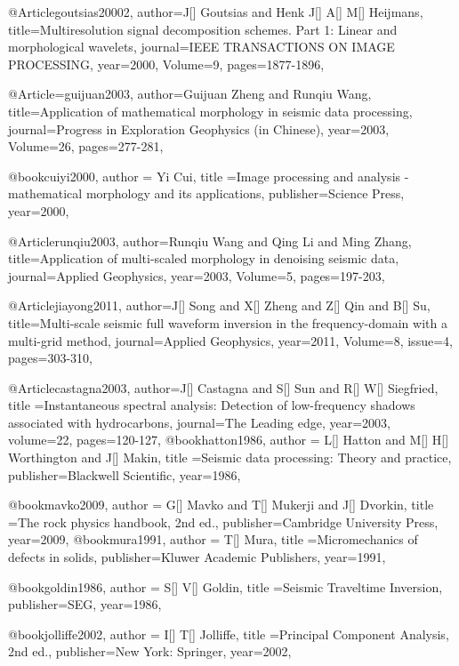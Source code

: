 @Article{goutsias20002,
  author={J[] Goutsias and Henk J[] A[] M[] Heijmans},
  title={Multiresolution signal decomposition schemes. Part 1: Linear and morphological wavelets},
  journal={IEEE TRANSACTIONS ON IMAGE PROCESSING},
  year=2000,
  Volume=9,
  pages={1877-1896},
}

@Article={guijuan2003,
  author={Guijuan Zheng and Runqiu Wang},
  title={Application of mathematical morphology in seismic data processing},
  journal={Progress in Exploration Geophysics (in Chinese)},
  year=2003,
  Volume=26,
  pages={277-281},
}

@book{cuiyi2000,
  author = {Yi Cui},
  title ={Image processing and analysis - mathematical morphology and its applications},
  publisher={Science Press},
  year=2000,
}


@Article{runqiu2003,
  author={Runqiu Wang and Qing Li and Ming Zhang},
  title={Application of multi-scaled morphology in denoising seismic data},
  journal={Applied Geophysics},
  year=2003,
  Volume=5,
  pages={197-203},
}

@Article{jiayong2011,
  author={J[] Song and X[] Zheng and Z[] Qin and B[] Su},
  title={Multi-scale seismic full waveform inversion in the frequency-domain with a multi-grid method},
  journal={Applied Geophysics},
  year=2011,
  Volume=8,
  issue=4,
  pages={303-310},
}

@Article{castagna2003,
  author={J[] Castagna and S[] Sun and R[] W[] Siegfried},
  title ={Instantaneous spectral
analysis: Detection of low-frequency shadows associated with hydrocarbons},
  journal={The Leading edge},
  year=2003,
  volume=22,
  pages={120-127},
}
@book{hatton1986,
  author = {L[] Hatton and M[] H[] Worthington and J[] Makin},
  title ={Seismic data processing: Theory and practice},
  publisher={Blackwell Scientific},
  year=1986,
}

@book{mavko2009,
  author = {G[] Mavko and T[] Mukerji and J[] Dvorkin},
  title ={The rock physics handbook, 2nd ed.},
  publisher={Cambridge University Press},
  year=2009,
}
@book{mura1991,
  author = {T[] Mura},
  title ={Micromechanics of defects in solids},
  publisher={Kluwer Academic Publishers},
  year=1991,
}


@book{goldin1986,
  author = {S[] V[] Goldin},
  title ={Seismic Traveltime Inversion},
  publisher={SEG},
  year=1986,
}

@book{jolliffe2002,
  author = {I[] T[] Jolliffe},
  title ={Principal Component Analysis, 2nd ed.},
  publisher={New York: Springer},
  year=2002,
}

